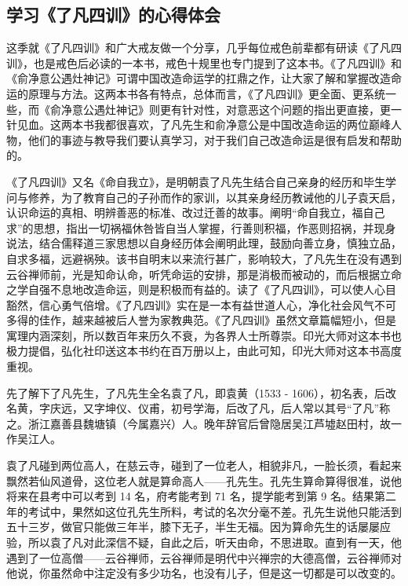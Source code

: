 \subsection{学习《了凡四训》的心得体会}\label{129}

这季就《了凡四训》和广大戒友做一个分享，几乎每位戒色前辈都有研读《了凡四训》，也是戒色后必读的一本书，戒色十规里也专门提到了这本书。《了凡四训》和《俞净意公遇灶神记》可谓中国改造命运学的扛鼎之作，让大家了解和掌握改造命运的原理与方法。这两本书各有特点，总体而言，《了凡四训》更全面、更系统一些，而《俞净意公遇灶神记》则更有针对性，对意恶这个问题的指出更直接，更一针见血。这两本书我都很喜欢，了凡先生和俞净意公是中国改造命运的两位巅峰人物，他们的事迹与教导我们要认真学习，对于我们自己改造命运是很有启发和帮助的。

《了凡四训》又名《命自我立》，是明朝袁了凡先生结合自己亲身的经历和毕生学问与修养，为了教育自己的子孙而作的家训，以其亲身经历教诫他的儿子袁天启，认识命运的真相、明辨善恶的标准、改过迁善的故事。阐明“命自我立，福自己求”的思想，指出一切祸福休咎皆自当人掌握，行善则积福，作恶则招祸，并现身说法，结合儒释道三家思想以自身经历体会阐明此理，鼓励向善立身，慎独立品，自求多福，远避祸殃。该书自明末以来流行甚广，影响较大，了凡先生在没有遇到云谷禅师前，光是知命认命，听凭命运的安排，那是消极而被动的，而后根据立命之学自强不息地改造命运，则是积极而有益的。读了《了凡四训》，可以使人心目豁然，信心勇气倍增。《了凡四训》实在是一本有益世道人心，净化社会风气不可多得的佳作，越来越被后人誉为家教典范。《了凡四训》虽然文章篇幅短小，但是寓理内涵深刻，所以数百年来历久不衰，为各界人士所尊崇。印光大师对这本书也极力提倡，弘化社印送这本书约在百万册以上，由此可知，印光大师对这本书高度重视。

先了解下了凡先生，了凡先生全名袁了凡，即袁黄（1533 - 1606），初名表，后改名黄，字庆远，又字坤仪、仪甫，初号学海，后改了凡，后人常以其号“了凡”称之。浙江嘉善县魏塘镇（今属嘉兴）人。晚年辞官后曾隐居吴江芦墟赵田村，故一作吴江人。

袁了凡碰到两位高人，在慈云寺，碰到了一位老人，相貌非凡，一脸长须，看起来飘然若仙风道骨，这位老人就是算命高人——孔先生。孔先生算命算得很准，说他将来在县考中可以考到 14 名，府考能考到 71 名，提学能考到第 9 名。结果第二年的考试中，果然如这位孔先生所料，考试的名次分毫不差。孔先生说他只能活到五十三岁，做官只能做三年半，膝下无子，半生无福。因为算命先生的话屡屡应验，所以袁了凡对此深信不疑，自此之后，听天由命，不思进取。直到有一天，他遇到了一位高僧——云谷禅师，云谷禅师是明代中兴禅宗的大德高僧，云谷禅师对他说，你虽然命中注定没有多少功名，也没有儿子，但是这一切都是可以改变的。

